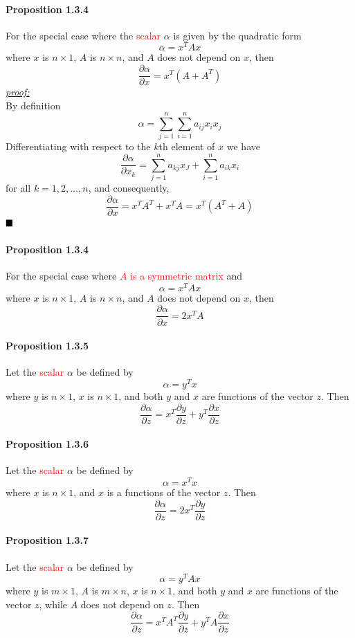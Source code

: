 \documentclass[11pt]{article}
\newcommand{\proof}[0]{\textit{\underline{proof:} }}
\newcommand{\qed}[0]{$\hfill\blacksquare$}
\begin{document}
\paragraph{Proposition 1.3.4}
For the special case where the \textcolor{red}{scalar} $\alpha$ is given by the quadratic form
$$\alpha = x^TAx$$
where $x$ is $n \times 1$, $A$ is $n \times n$, and $A$ does not depend on $x$, then
$$\frac{\partial \alpha}{\partial x} = x^T (A + A^T)$$
\proof \\
By definition
$$\alpha = \sum_{j=1}^n \sum_{i=1}^n a_{ij}x_ix_j$$
Differentiating with respect to the $k$th element of $x$ we have
$$\frac{\partial \alpha}{\partial x_k} = \sum_{j=1}^n a_{kj}x_J + \sum_{i=1}^n a_{ik}x_i$$
for all $k = 1,2, \hdots, n$, and consequently,
$$\frac{\partial \alpha}{\partial x} = x^TA^T + x^TA = x^T(A^T + A)$$ \qed

\paragraph{Proposition 1.3.4}
For the special case where \textcolor{red}{$A$ is a symmetric matrix} and
$$\alpha = x^TAx$$
where $x$ is $n \times 1$, $A$ is $n \times n$, and $A$ does not depend on $x$, then
$$\frac{\partial \alpha}{\partial x} = 2x^TA$$

\paragraph{Proposition 1.3.5}
Let the \textcolor{red}{scalar} $\alpha$ be defined by
$$\alpha = y^Tx$$
where $y$ is $n \times 1$, $x$ is $n \times 1$, and both $y$ and $x$ are functions of the vector $z$. Then
$$\frac{\partial \alpha}{\partial z} = x^T \frac{\partial y}{\partial z} + y^T \frac{\partial x}{\partial z}$$

\paragraph{Proposition 1.3.6}
Let the \textcolor{red}{scalar} $\alpha$ be defined by
$$\alpha = x^Tx$$
where $x$ is $n \times 1$, and $x$ is a functions of the vector $z$. Then
$$\frac{\partial \alpha}{\partial z} = 2x^T \frac{\partial y}{\partial z}$$

\paragraph{Proposition 1.3.7}
Let the \textcolor{red}{scalar} $\alpha$ be defined by
$$\alpha = y^TAx$$
where $y$ is $m \times 1$, $A$ is $m \times n$, $x$ is $n \times 1$, and both $y$ and $x$ are functions of the vector $z$, while $A$ does not depend on $z$. Then
$$\frac{\partial \alpha}{\partial z} = x^T A^T\frac{\partial y}{\partial z} + y^T A\frac{\partial x}{\partial z}$$
\end{document}
